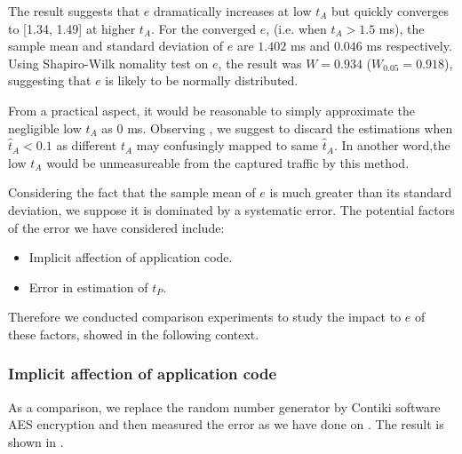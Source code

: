 The result suggests that $e$ dramatically increases at low $t_A$ but quickly converges to [1.34, 1.49] at higher $t_A$. For the converged $e$, (i.e. when $t_A > 1.5$ ms), the sample mean and standard deviation of $e$ are $1.402$ ms and $0.046$ ms respectively. Using Shapiro-Wilk nomality test on $e$, the result was $W = 0.934$ ($W_{0.05} = 0.918$), suggesting that $e$ is likely to be normally distributed.

From a practical aspect, it would be reasonable to simply approximate the negligible low $t_A$ as $0$ ms. Observing , we suggest to discard the estimations when $\hat{t}_A < 0.1$ as different $t_A$ may confusingly mapped to same $\hat{t}_A$. In another word,the low $t_A$ would be unmeasureable from the captured traffic by this method.

Considering the fact that the sample mean of $e$ is much greater than its standard deviation, we suppose it is dominated by a systematic error. The potential factors of the error we have considered include:
\begin{itemize}
	\item Implicit affection of application code.
	\item Error in estimation of $t_P$.
\end{itemize}

Therefore we conducted comparison experiments to study the impact to $e$ of these factors, showed in the following context.

\subsubsection{Implicit affection of application code} \label{Affection of application code}

As a comparison, we replace the random number generator by Contiki software AES encryption and then measured the error as we have done on . The result is shown in .

